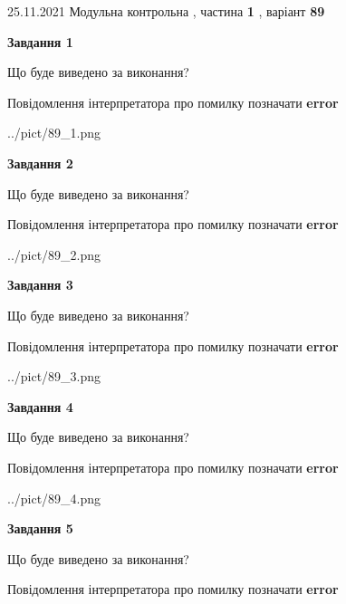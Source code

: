 \documentclass[10pt, ukrainian]{article}
\begin{document}
{25.11.2021 Модульна контрольна , частина \textbf { 1 }, варіант  \No \textbf { 89 }\par}
{
\begin {large}

{\begin {center}\textbf{Завдання 1}\end {center}}\par
Що буде виведено за виконання? \par
Повідомлення інтерпретатора про помилку позначати \textbf{error}

\begin{center}
	{../pict/89_1.png}
\end{center}
\newpage

{\begin {center}\textbf{Завдання 2}\end {center}}\par
Що буде виведено за виконання? \par
Повідомлення інтерпретатора про помилку позначати \textbf{error}

\begin{center}
	{../pict/89_2.png}
\end{center}
\newpage

{\begin {center}\textbf{Завдання 3}\end {center}}\par
Що буде виведено за виконання? \par
Повідомлення інтерпретатора про помилку позначати \textbf{error}

\begin{center}
	{../pict/89_3.png}
\end{center}
\newpage

{\begin {center}\textbf{Завдання 4}\end {center}}\par
Що буде виведено за виконання? \par
Повідомлення інтерпретатора про помилку позначати \textbf{error}

\begin{center}
	{../pict/89_4.png}
\end{center}
\newpage

{\begin {center}\textbf{Завдання 5}\end {center}}\par
Що буде виведено за виконання? \par
Повідомлення інтерпретатора про помилку позначати \textbf{error}


\end{large}}
\end{document}
